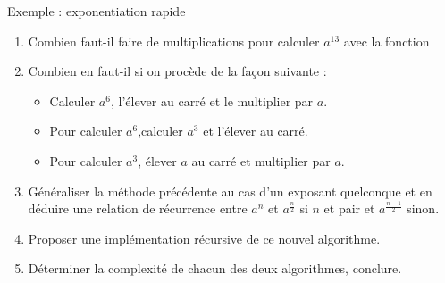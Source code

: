 \documentclass[10pt]{beamer}
\begin{document}
\begin{frame}[fragile]{\Ctitle}{\stitle}
	\begin{exampleblock}{Exemple : exponentiation rapide}
		\begin{enumerate}
			\item<1->{\small Combien faut-il faire de multiplications pour calculer $a^{13}$ avec la fonction}
			\item<2-> {\small Combien en faut-il si on procède de la façon suivante :}
				\begin{itemize}
					\item<3-> Calculer $a^6$, l'élever au carré et le multiplier par $a$.
					\item<4-> Pour calculer $a^6$,calculer $a^3$ et l'élever au carré.
					\item<5-> Pour calculer $a^3$, élever $a$ au carré et multiplier par $a$.
				\end{itemize}
			\item<6-> {\small Généraliser la méthode précédente au cas d'un exposant quelconque et en déduire une relation de récurrence entre $a^n$ et $a^\frac{n}{2}$ si $n$ et pair et $a^\frac{n-1}{2}$ sinon.}
			\item<7-> {\small Proposer une implémentation récursive de ce nouvel algorithme.}
			\item<8-> {\small Déterminer la complexité de chacun des deux algorithmes, conclure.}
		\end{enumerate}
	\end{exampleblock}
\end{frame}
\end{document}

